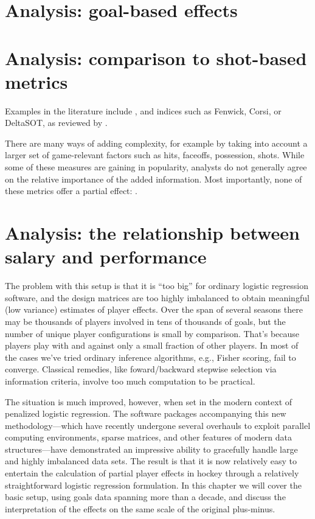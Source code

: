 \section{Analysis: goal-based effects}
\label{sec:goals}

\section{Analysis: comparison to shot-based metrics}
\label{sec:shots}

Examples in
the literature include , and indices
such as Fenwick, Corsi, or DeltaSOT, as reviewed by \cite{vol10}. 

There are many
ways of adding complexity, for example by taking into account a larger set of
game-relevant factors such as hits, faceoffs, possession, shots.   While some
of these measures are gaining in popularity, analysts do not generally agree
on the relative importance of the added information.  Most importantly, none
of these metrics offer a partial effect: .

\section{Analysis: the relationship between salary and performance}
\label{sec:salary}

The problem with this setup is that it is ``too big'' for ordinary logistic
regression software, and the design matrices are too highly imbalanced to
obtain meaningful (low variance) estimates of player effects.  Over the span
of several seasons there may be thousands of players involved in tens of
thousands of goals, but the number of unique player configurations is small by
comparison. That's because players play with and against only a small fraction
of other players.  In most of the cases we've tried ordinary inference
algorithms, e.g., Fisher scoring, fail to converge.  Classical remedies, like
foward/backward stepwise selection via information criteria, involve too much
computation to be practical.

The situation is much improved, however, when set in the modern context of
penalized logistic regression.  The software packages accompanying this new
methodology---which have recently undergone several overhauls to exploit
parallel computing environments, sparse matrices, and other features of modern
data structures---have demonstrated an impressive ability to gracefully handle
large and highly imbalanced data sets.  The result is that it is now relatively
easy to entertain the calculation of partial player effects in hockey through
a relatively straightforward logistic regression formulation.  In this chapter
we will cover the basic setup, using goals data spanning more than a decade,
and discuss the interpretation of the effects on the same scale of the
original plus-minus.  

